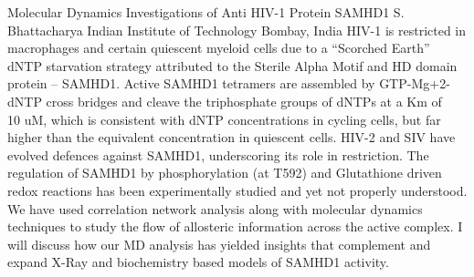 
    \begin{abstract_online}{Molecular Dynamics Investigations of Anti HIV-1 Protein SAMHD1}{%
        S. Bhattacharya}{%
        \IStag}{%
        Indian Institute of Technology Bombay, India}
    HIV-1 is restricted in macrophages and certain quiescent myeloid cells due to a “Scorched Earth” dNTP starvation strategy attributed to the Sterile Alpha Motif and HD domain protein – SAMHD1. Active SAMHD1 tetramers are assembled by GTP-Mg+2-dNTP cross bridges and cleave the triphosphate groups of dNTPs at a Km of ~ 10 uM, which is consistent with dNTP concentrations in cycling cells, but far higher than the equivalent concentration in quiescent cells. HIV-2 and SIV have evolved defences against SAMHD1, underscoring its role in restriction. The regulation of SAMHD1 by phosphorylation (at T592) and Glutathione driven redox reactions  has been experimentally studied and yet not properly understood. We have used correlation network analysis along with molecular dynamics techniques to study the flow of allosteric information across the active complex. I will discuss how our MD analysis has yielded insights that complement and expand X-Ray and biochemistry based models of SAMHD1 activity. 
    
    \end{abstract_online}
    